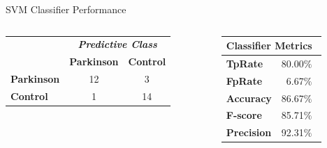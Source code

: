 \documentclass{beamer}
\begin{document}
\begin{frame}{SVM Classifier Performance}
   \begin{block}{}
   
   \begin{columns}[c]
     \begin{column}{0.5\linewidth}
				\begin{table}[!htbp]
					\label{table:resultadomatrizconfusaosvm}
					\centering
					\begin{tabular}{l|c|c|}
					\cline{2-3}
					\multicolumn{1}{c}{}                         & \multicolumn{2}{|c|}{\textit{\textbf{Predictive Class}}} \\ \cline{2-3} 
																											 & \textbf{Parkinson}      & \textbf{Control}         \\ \hline
					\multicolumn{1}{|l|}{\textbf{Parkinson}} & 12       & 3           \\ \hline
					\multicolumn{1}{|l|}{\textbf{Control}}     & 1           & 14     \\ \hline
					\end{tabular}
			\end{table}

     \end{column}

     \begin{column}{0.55\linewidth}
						\begin{table}[htbp!]
						\begin{tabular}{|l|r|}
						\hline
						\multicolumn{2}{|l|}{\textbf{Classifier Metrics}} \\ \hline
						\textbf{TpRate}                    & 80.00$\%$\                 \\ \hline
						\textbf{FpRate}                    & 6.67$\%$\                \\ \hline
						\textbf{Accuracy}                  & 86.67$\%$\                \\ \hline
						\textbf{F-score}                   & 85.71$\%$\                \\ \hline
						\textbf{Precision}                  & 92.31$\%$\                \\ \hline
						\end{tabular}
						\end{table}
    \end{column}
\end{columns}
\end{block}
\end{frame}
\end{document}
